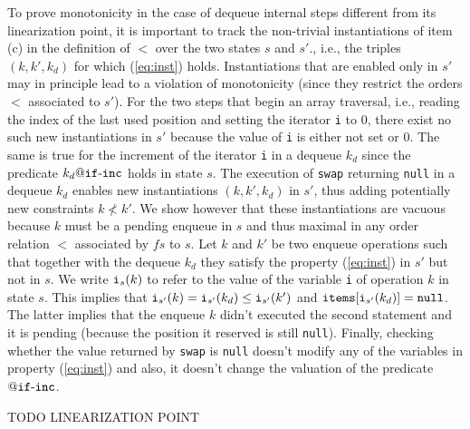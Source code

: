 To prove monotonicity in the case of dequeue internal steps different from its linearization point, it is important to track the non-trivial instantiations of item (c) in the definition of $<$ over the two states $s$ and $s'$., i.e., the triples $(k,k',k_d)$ for which (\ref{eq:inst}) holds. Instantiations that are enabled only in $s'$ may in principle lead to a violation of monotonicity (since they restrict the orders $<$ associated to $s'$). For the two steps that begin an array traversal, i.e., reading the index of the last used position and setting the iterator {\tt i} to $0$, there exist no  such new instantiations in $s'$ because the value of {\tt i} is either not set or $0$. %
%
%
%
%
The same is true for the increment of the iterator {\tt i} in a dequeue $k_d$ since the predicate $k_d\atCP {\tt if}\text{-}{\tt inc}$ holds in state $s$.
The execution of {\tt swap} returning {\tt null} in a dequeue $k_d$ enables new instantiations $(k,k',k_d)$ in $s'$, thus adding potentially new constraints $k\not< k'$. We show however that these instantiations are vacuous because $k$ must be a pending enqueue in $s$ and thus maximal in any order relation $<$ associated by $\mathit{fs}$ to $s$.
Let $k$ and $k'$ be two enqueue operations such that together with the dequeue $k_d$ they satisfy the property (\ref{eq:inst}) in $s'$ but not in $s$. 
We write ${\tt i}_s(k)$ to refer to the value of the variable {\tt i} of operation $k$ in state $s$. 
This implies that ${\tt i}_{s'}(k) = {\tt i}_{s'}(k_d) \leq {\tt i}_{s'}(k')$ and ${\tt items}[{\tt i}_{s'}(k_d)]={\tt null}$. The latter implies that the enqueue $k$ didn't executed
the second statement and it is pending (because the position it reserved is still {\tt null}). Finally, checking whether the value returned by {\tt swap} is {\tt null} doesn't modify any of the variables in property  (\ref{eq:inst}) and also, it doesn't change the valuation of the predicate $\atCP {\tt if}\text{-}{\tt inc}$.

TODO LINEARIZATION POINT

